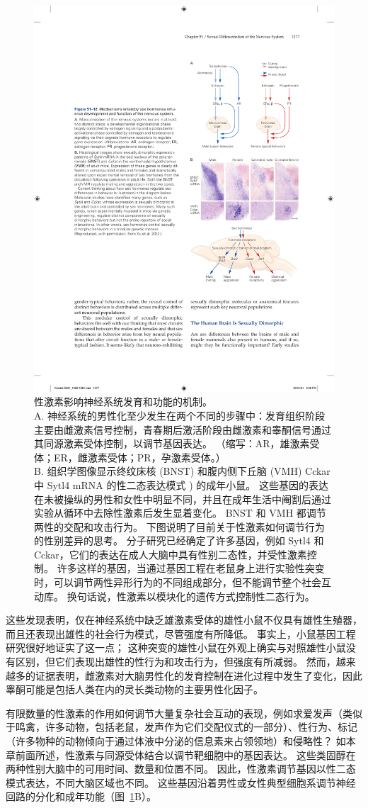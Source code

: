 \begin{figure}[htbp]
	\centering
	\includegraphics[width=0.55\linewidth]{chap51/fig_51_12}
	\caption{性激素影响神经系统发育和功能的机制。\protect\\
		A. 神经系统的男性化至少发生在两个不同的步骤中：发育组织阶段主要由雌激素信号控制，青春期后激活阶段由雌激素和睾酮信号通过其同源激素受体控制，以调节基因表达。 （缩写：AR，雄激素受体；ER，雌激素受体；PR，孕激素受体。）\protect\\
		B. 组织学图像显示终纹床核 (BNST) 和腹内侧下丘脑 (VMH) Cckar 中 Sytl4 mRNA 的性二态表达模式 ) 的成年小鼠。
		这些基因的表达在未被操纵的男性和女性中明显不同，并且在成年生活中阉割后通过实验从循环中去除性激素后发生显着变化。
		BNST 和 VMH 都调节两性的交配和攻击行为。
		下图说明了目前关于性激素如何调节行为的性别差异的思考。
		分子研究已经确定了许多基因，例如 Sytl4 和 Cckar，它们的表达在成人大脑中具有性别二态性，并受性激素控制。
		许多这样的基因，当通过基因工程在老鼠身上进行实验性突变时，可以调节两性异形行为的不同组成部分，但不能调节整个社会互动库。
		换句话说，性激素以模块化的遗传方式控制性二态行为\cite{xu2012modular}。}
	\label{fig:51_12}
\end{figure}


这些发现表明，仅在神经系统中缺乏雄激素受体的雄性小鼠不仅具有雄性生殖器，而且还表现出雄性的社会行为模式，尽管强度有所降低。
事实上，小鼠基因工程研究很好地证实了这一点；
这种突变的雄性小鼠在外观上确实与对照雄性小鼠没有区别，但它们表现出雄性的性行为和攻击行为，但强度有所减弱。
然而，越来越多的证据表明，雌激素对大脑男性化的发育控制在进化过程中发生了变化，因此睾酮可能是包括人类在内的灵长类动物的主要男性化因子。


有限数量的性激素的作用如何调节大量复杂社会互动的表现，例如求爱发声（类似于鸣禽，许多动物，包括老鼠，发声作为它们交配仪式的一部分）、性行为、标记 （许多物种的动物倾向于通过体液中分泌的信息素来占领领地）和侵略性？
如本章前面所述，性激素与同源受体结合以调节靶细胞中的基因表达。
这些类固醇在两种性别大脑中的可用时间、数量和位置不同。
因此，性激素调节基因以性二态模式表达，不同大脑区域也不同。
这些基因沿着男性或女性典型细胞系调节神经回路的分化和成年功能（图~\ref{fig:51_12}B）。


